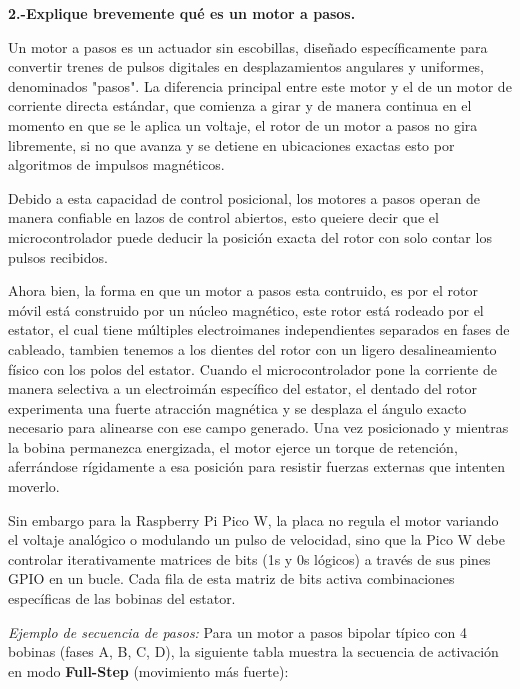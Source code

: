 \documentclass[letterpaper,12pt]{article}
\begin{document}
    \newpage
    \noindent\textbf{2.-Explique brevemente qué es un motor a pasos.}

    Un motor a pasos es un actuador sin escobillas, diseñado específicamente para convertir trenes de pulsos digitales
    en desplazamientos angulares y uniformes, denominados "pasos". La diferencia principal entre este motor y el de un motor de corriente directa estándar,
    que comienza a girar y de manera continua en el momento en que se le aplica un voltaje,
    el rotor de un motor a pasos no gira libremente, si no que avanza y se detiene en ubicaciones exactas
    esto por algoritmos de impulsos magnéticos.
    
    Debido a esta capacidad de control posicional, los motores a pasos operan
    de manera confiable en lazos de control abiertos, esto queiere decir
    que el microcontrolador puede deducir la posición exacta del rotor con solo contar los pulsos recibidos.  
    
    Ahora bien, la forma en que un motor a pasos esta contruido, es por el rotor móvil está construido
    por un núcleo magnético, este rotor está rodeado por el estator, el cual tiene múltiples electroimanes
    independientes separados en fases de cableado, tambien tenemos a los dientes del rotor
    con un ligero desalineamiento físico con los polos del estator.
    Cuando el microcontrolador pone la corriente de manera selectiva a un electroimán específico del estator,
    el dentado del rotor experimenta una fuerte atracción magnética y se desplaza el ángulo exacto necesario 
    para alinearse con ese campo generado. 
    Una vez posicionado y mientras la bobina permanezca energizada, el motor ejerce un torque de retención, 
    aferrándose rígidamente a esa posición para resistir fuerzas externas que intenten moverlo.

    Sin embargo para la Raspberry Pi Pico W,
    la placa no regula el motor variando el voltaje analógico o modulando un pulso de velocidad,
    sino que la Pico W debe controlar iterativamente matrices de bits (1s y 0s lógicos) a través de sus pines GPIO
    en un bucle. Cada fila de esta matriz de bits activa combinaciones específicas de las bobinas del estator.

    \textit{Ejemplo de secuencia de pasos:} Para un motor a pasos bipolar típico con 4 bobinas (fases A, B, C, D), la siguiente tabla muestra la secuencia de activación en modo \textbf{Full-Step} (movimiento más fuerte):
\end{document}

